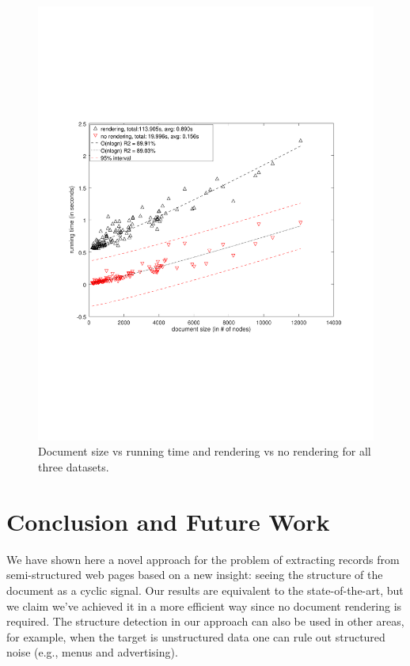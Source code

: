 \documentclass{vldb}
\begin{document}
\begin{figure}[h]
  \centering
     \includegraphics[trim={2.5cm 7.5cm 1cm 6.5cm}, width=\linewidth
     ]{img/runtime.pdf}
  \caption{Document size vs running time and rendering vs no rendering for all
  three datasets.}
  \label{fig:runtime}
\end{figure}

\section{Conclusion and Future Work}\label{sec:con}

We have shown here a novel approach for the problem of extracting records from
semi-structured web pages based on a new insight: seeing the structure of the
document as a cyclic signal. Our results are equivalent to the state-of-the-art,
but we claim we've achieved it in a more efficient way since no document
rendering is required. The structure detection in our approach can also be used
in other areas, for example, when the target is unstructured data one can rule
out structured noise (e.g., menus and advertising).
\end{document}
